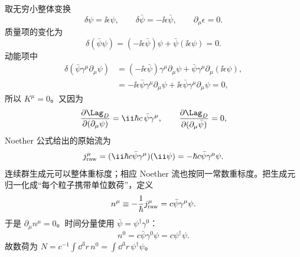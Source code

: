 \begin{exbox}
取无穷小整体变换
\begin{equation*}
 \delta\psi=\ii\epsilon\psi,
 \qquad
 \delta\bar\psi=-\ii\epsilon\bar\psi,
 \qquad \partial_\mu\epsilon=0.
\end{equation*}
质量项的变化为
\begin{equation*}
 \delta(\bar\psi\psi)
 =(-\ii\epsilon\bar\psi)\psi
 +\bar\psi(\ii\epsilon\psi)=0.
\end{equation*}
动能项中
\begin{align*}
 \delta\!\left(\bar\psi\gamma^\mu\partial_\mu\psi\right)
 &=(-\ii\epsilon\bar\psi)\gamma^\mu\partial_\mu\psi
 +\bar\psi\gamma^\mu\partial_\mu(\ii\epsilon\psi),\\
 &=-\ii\epsilon\bar\psi\gamma^\mu\partial_\mu\psi
 +\ii\epsilon\bar\psi\gamma^\mu\partial_\mu\psi=0,
\end{align*}
所以 $K^\mu=0$。又因为
\begin{equation*}
 \frac{\partial\Lag_D}{\partial(\partial_\mu\psi)}
 =\ii\hbar c\,\bar\psi\gamma^\mu,
 \qquad
 \frac{\partial\Lag_D}{\partial(\partial_\mu\bar\psi)}=0,
\end{equation*}
Noether 公式给出的原始流为
\begin{equation*}
 j_{\rm raw}^\mu
 =(\ii\hbar c\bar\psi\gamma^\mu)(\ii\psi)
 =-\hbar c\bar\psi\gamma^\mu\psi.
\end{equation*}
连续群生成元可以整体重标度；相应 Noether 流也按同一常数重标度。把生成元归一化成“每个粒子携带单位数荷”，定义
\begin{equation*}
 n^\mu\equiv-\frac1\hbar j_{\rm raw}^\mu
 =c\bar\psi\gamma^\mu\psi.
\end{equation*}
于是 $\partial_\mu n^\mu=0$。时间分量使用 $\bar\psi=\psi^\dagger\gamma^0$：
\begin{equation*}
 n^0=c\bar\psi\gamma^0\psi
 =c\psi^\dagger\psi.
\end{equation*}
故数荷为 $N=c^{-1}\int\dd^3 r\,n^0=\int\dd^3 r\,\psi^\dagger\psi$。
\end{exbox}

